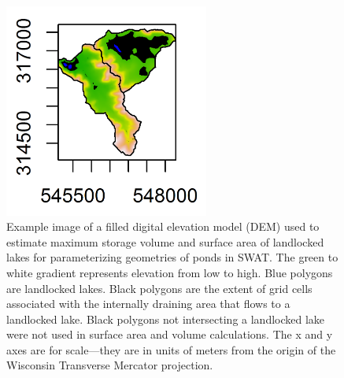 \begin{figure}[H]
	\centering
	\includegraphics[width=0.6\textwidth]{./img/maximum_pond_volume.png}
	\caption{Example image of a filled digital elevation model (DEM) used to estimate maximum storage volume and surface area of landlocked lakes for parameterizing geometries of ponds in SWAT. The green to white gradient represents elevation from low to high. Blue polygons are landlocked lakes. Black polygons are the extent of grid cells associated with the internally draining area that flows to a landlocked lake. Black polygons not intersecting a landlocked lake were not used in surface area and volume calculations. The x and y axes are for scale---they are in units of meters from the origin of the Wisconsin Transverse Mercator projection.}
	\label{fig:maximum_pond_volume}
\end{figure}

